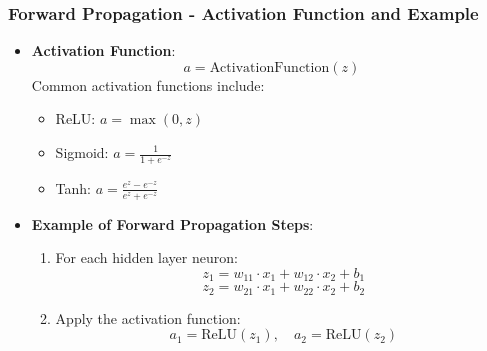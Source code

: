 \documentclass[aspectratio=169]{beamer}
\begin{document}
\begin{frame}[fragile]
    \frametitle{Forward Propagation - Activation Function and Example}
    \begin{itemize}
        \item \textbf{Activation Function}:
        \begin{equation}
            a = \text{ActivationFunction}(z)
        \end{equation}
        Common activation functions include:
        \begin{itemize}
            \item ReLU: \( a = \max(0, z) \)
            \item Sigmoid: \( a = \frac{1}{1 + e^{-z}} \)
            \item Tanh: \( a = \frac{e^{z} - e^{-z}}{e^{z} + e^{-z}} \)
        \end{itemize}

        \item \textbf{Example of Forward Propagation Steps}:
        \begin{enumerate}
            \item For each hidden layer neuron:
            \begin{equation}
                z_1 = w_{11} \cdot x_1 + w_{12} \cdot x_2 + b_1
            \end{equation}
            \begin{equation}
                z_2 = w_{21} \cdot x_1 + w_{22} \cdot x_2 + b_2
            \end{equation}
            \item Apply the activation function:
            \begin{equation}
                a_1 = \text{ReLU}(z_1), \quad a_2 = \text{ReLU}(z_2)
            \end{equation}
        \end{enumerate}
    \end{itemize}
\end{frame}
\end{document}
